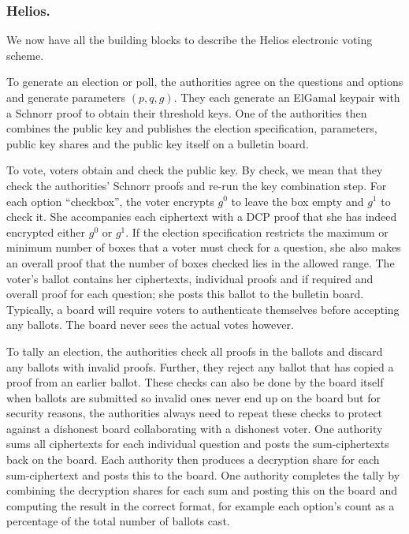 \documentclass{llncs}
\begin{document}
\subsubsection{Helios.}
We now have all the building blocks to describe the Helios electronic voting
scheme.

To generate an election or poll, the authorities agree on the questions and
options and generate parameters $(p, q, g)$. They each generate an ElGamal
keypair with a Schnorr proof to obtain their threshold keys. One of the
authorities then combines the public key and publishes the election
specification, parameters, public key shares and the public key itself on a
bulletin board.

To vote, voters obtain and check the public key. By check, we mean that they
check the authorities' Schnorr proofs and re-run the key combination step.
For each option ``checkbox'', the voter encrypts $g^0$ to leave the box empty
and $g^1$ to check it. She accompanies each ciphertext with a DCP proof that she
has indeed encrypted either $g^0$ or $g^1$. If the election specification
restricts the maximum or minimum number of boxes that a voter must check for a
question, she also makes an overall proof that the number of boxes checked lies
in the allowed range. The voter's ballot contains her ciphertexts, individual
proofs and if required and overall proof for each question; she posts this
ballot to the bulletin board. Typically, a board will require voters to
authenticate themselves before accepting any ballots. The board never sees the
actual votes however.

To tally an election, the authorities check all proofs in the ballots and
discard any ballots with invalid proofs. Further, they reject any ballot that
has copied a proof from an earlier ballot\footnotemark. These checks can also
be done by the board itself when ballots are submitted so invalid ones never end
up on the board but for security reasons, the authorities always need to
repeat these checks to protect against a dishonest board collaborating with a
dishonest voter.
One authority sums all ciphertexts for each individual question and posts
the sum-ciphertexts back on the board. Each authority then produces a
decryption share for each sum-ciphertext and posts this to the board. One
authority completes the tally by combining the decryption shares for each sum
and posting this on the board and computing the result in the correct format,
for example each option's count as a percentage of the total number of ballots
cast.
\end{document}
